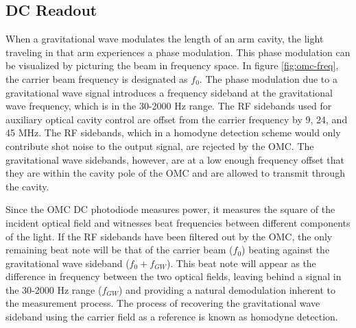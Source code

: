 \subsection{DC Readout}

When a gravitational wave modulates the length of an arm cavity, the light 
traveling in that arm experiences a phase modulation. This phase modulation 
can be visualized by picturing the beam in frequency space. In figure 
\ref{fig:omc-freq}, the carrier beam frequency is designated as $f_0$. 
The phase modulation due to 
a gravitational wave signal introduces a frequency sideband at the 
gravitational wave frequency, which is in the 30-2000 Hz range. 
The 
RF sidebands used for auxiliary optical cavity control are offset from the 
carrier frequency by 9, 24, and 45 MHz. 
The RF sidebands, which in a 
homodyne detection scheme would only contribute shot noise to the output signal, 
are rejected by the OMC. The gravitational wave sidebands, however, are at a 
low enough frequency offset that they are within the cavity pole of the OMC 
and are allowed to transmit through the cavity.

Since the OMC DC photodiode measures power, it measures the square of the 
incident optical field and witnesses beat frequencies between different 
components of the light. If the RF sidebands have been filtered out by 
the OMC, the only remaining beat note will be that of the carrier beam ($f_0$) 
beating against the gravitational wave sideband ($f_0 + f_{GW}$). This beat note will 
appear as the difference in frequency between the two optical fields, 
leaving behind a signal in the 30-2000 Hz range ($f_{GW}$) and providing a 
natural demodulation inherent to the measurement process. 
The process of recovering the gravitational wave sideband using the 
carrier field as a reference is known as homodyne detection. 

